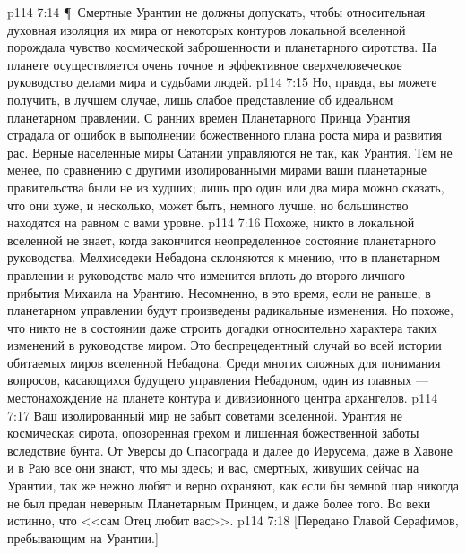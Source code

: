 \vs p114 7:14 \P\ Смертные Урантии не должны допускать, чтобы относительная духовная изоляция их мира от некоторых контуров локальной вселенной порождала чувство космической заброшенности и планетарного сиротства. На планете осуществляется очень точное и эффективное сверхчеловеческое руководство делами мира и судьбами людей.
\vs p114 7:15 Но, правда, вы можете получить, в лучшем случае, лишь слабое представление об идеальном планетарном правлении. С ранних времен Планетарного Принца Урантия страдала от ошибок в выполнении божественного плана роста мира и развития рас. Верные населенные миры Сатании управляются не так, как Урантия. Тем не менее, по сравнению с другими изолированными мирами ваши планетарные правительства были не из худших; лишь про один или два мира можно сказать, что они хуже, и несколько, может быть, немного лучше, но большинство находятся на равном с вами уровне.
\vs p114 7:16 Похоже, никто в локальной вселенной не знает, когда закончится неопределенное состояние планетарного руководства. Мелхиседеки Небадона склоняются к мнению, что в планетарном правлении и руководстве мало что изменится вплоть до второго личного прибытия Михаила на Урантию. Несомненно, в это время, если не раньше, в планетарном управлении будут произведены радикальные изменения. Но похоже, что никто не в состоянии даже строить догадки относительно характера таких изменений в руководстве миром. Это беспрецедентный случай во всей истории обитаемых миров вселенной Небадона. Среди многих сложных для понимания вопросов, касающихся будущего управления Небадоном, один из главных --- местонахождение на планете контура и дивизионного центра архангелов.
\vs p114 7:17 Ваш изолированный мир не забыт советами вселенной. Урантия не космическая сирота, опозоренная грехом и лишенная божественной заботы вследствие бунта. От Уверсы до Спасограда и далее до Иерусема, даже в Хавоне и в Раю все они знают, что мы здесь; и вас, смертных, живущих сейчас на Урантии, так же нежно любят и верно охраняют, как если бы земной шар никогда не был предан неверным Планетарным Принцем, и даже более того. Во веки истинно, что <<сам Отец любит вас>>.
\vs p114 7:18 [Передано Главой Серафимов, пребывающим на Урантии.]
